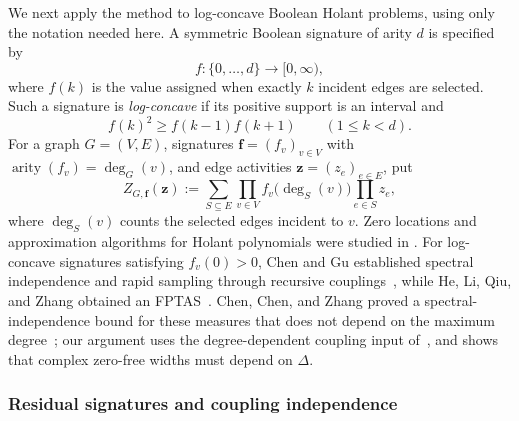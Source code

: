 \documentclass[11pt,reqno]{article}
\theoremstyle{plain}
\theoremstyle{definition}
\theoremstyle{remark}
\theoremstyle{definition}
\theoremstyle{remark}
\newcommand{\Deg}{\Delta}                        %
\begin{document}
We next apply the method to log-concave Boolean Holant problems, using only
the notation needed here.  A symmetric Boolean signature of arity \(d\) is specified by
\[
  f\colon\{0,\ldots,d\}\longrightarrow[0,\infty),
\]
where \(f(k)\) is the value assigned when exactly \(k\) incident edges are
selected.  Such a signature is \emph{log-concave} if its positive support
is an interval and
\[
  f(k)^2\ge f(k-1)f(k+1)
  \qquad(1\le k<d).
\]
For a graph \(G=(V,E)\), signatures
\(\mathbf f=(f_v)_{v\in V}\) with
\(\operatorname{arity}(f_v)=\deg_G(v)\), and edge activities
\(\mathbf z=(z_e)_{e\in E}\), put
\begin{equation}
  Z_{G,\mathbf f}(\mathbf z)
  :=\sum_{S\subseteq E}
       \prod_{v\in V}f_v\bigl(\deg_S(v)\bigr)
       \prod_{e\in S}z_e ,
  \label{eq:holant-short-Z}
\end{equation}
where \(\deg_S(v)\) counts the selected edges incident to \(v\).
Zero locations and approximation algorithms for Holant polynomials were
studied in \cite{GLLZ2019,Casel2019}.  For log-concave signatures satisfying
\(f_v(0)>0\), Chen and Gu established spectral independence and rapid
sampling through recursive couplings~\cite{ChenGu2023}, while
He, Li, Qiu, and Zhang obtained an FPTAS~\cite{HLQZ2025}.
Chen, Chen, and Zhang proved a spectral-independence bound for these
measures that does not depend on the maximum degree~\cite{ChenChenZhang2026};
our argument uses the degree-dependent coupling input
of~\cite{ChenGu2023}, and  shows
that complex zero-free widths must depend on \(\Deg\).

\subsubsection{Residual signatures and coupling independence}
\end{document}

